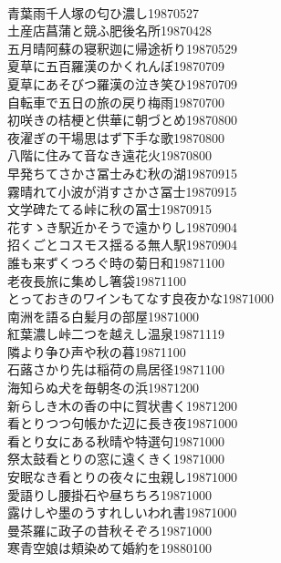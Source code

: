 \begin{multicols}{2}
\\青葉雨千人塚の匂ひ濃し\hfill{19870527}
\\土産店菖蒲と競ふ肥後名所\hfill{19870428}
\\五月晴阿蘇の寝釈迦に帰途祈り\hfill{19870529}
\\夏草に五百羅漢のかくれんぼ\hfill{19870709}
\\夏草にあそびつ羅漢の泣き笑ひ\hfill{19870709}
\\自転車で五日の旅の戻り梅雨\hfill{19870700}
\\初咲きの桔梗と供華に朝づとめ\hfill{19870800}
\\夜濯ぎの干場思はず下手な歌\hfill{19870800}
\\八階に住みて音なき遠花火\hfill{19870800}
\\早発ちてさかさ冨士みむ秋の湖\hfill{19870915}
\\霧晴れて小波が消すさかさ冨士\hfill{19870915}
\\文学碑たてる峠に秋の冨士\hfill{19870915}
\\花すゝき駅近かそうで遠かりし\hfill{19870904}
\\招くごとコスモス揺るる無人駅\hfill{19870904}
\\誰も来ずくつろぐ時の菊日和\hfill{19871100}
\\老夜長旅に集めし箸袋\hfill{19871100}
\\とっておきのワインもてなす良夜かな\hfill{19871000}
\\南洲を語る白髪月の部屋\hfill{19871000}
\\紅葉濃し峠二つを越えし温泉\hfill{19871119}
\\隣より争ひ声や秋の暮\hfill{19871100}
\\石蕗さかり先は稲荷の鳥居径\hfill{19871100}
\\海知らぬ犬を毎朝冬の浜\hfill{19871200}
\\新らしき木の香の中に賀状書く\hfill{19871200}
\\看とりつつ句帳かた辺に長き夜\hfill{19871000}
\\看とり女にある秋晴や特選句\hfill{19871000}
\\祭太鼓看とりの窓に遠くきく\hfill{19871000}
\\安眠なき看とりの夜々に虫親し\hfill{19871000}
\\愛語りし腰掛石や昼ちちろ\hfill{19871000}
\\露けしや墨のうすれしいわれ書\hfill{19871000}
\\曼茶羅に政子の昔秋そぞろ\hfill{19871000}
\\寒青空娘は頬染めて婚約を\hfill{19880100}

\end{multicols}
